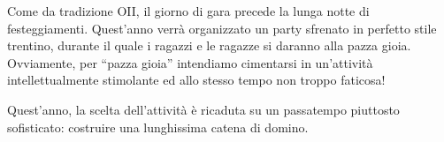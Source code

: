 \usepackage{xcolor}
\usepackage{afterpage}
\usepackage{pifont,mdframed}
\usepackage[bottom]{footmisc}



\renewcommand{\inputfile}{\texttt{stdin}}
\renewcommand{\outputfile}{\texttt{stdout}}
\makeatletter
\renewcommand{\this@inputfilename}{\texttt{stdin}}
\renewcommand{\this@outputfilename}{\texttt{stdout}}
\makeatother

\newenvironment{warning}
  {\par\begin{mdframed}[linewidth=2pt,linecolor=gray]%
    \begin{list}{}{\leftmargin=1cm
                   \labelwidth=\leftmargin}\item[\Large\ding{43}]}
  {\end{list}\end{mdframed}\par}

\newenvironment{todoenv}
{\par\begin{mdframed}[linewidth=2pt,linecolor=red]%
		\begin{list}{}{\leftmargin=1cm
				\labelwidth=\leftmargin}\item[\Large\ding{169}]}
		{\end{list}\end{mdframed}\par}

\newcommand{\todo}[1]{\begin{todoenv}
		TODO: #1
\end{todoenv}}



Come da tradizione OII, il giorno di gara precede la lunga notte di
festeggiamenti. Quest'anno verrà organizzato un party sfrenato
in perfetto stile trentino, durante il quale i ragazzi e le ragazze si daranno alla
pazza gioia. Ovviamente, per ``pazza gioia'' intendiamo cimentarsi in
un'attività intellettualmente stimolante ed allo stesso tempo non troppo
faticosa!

Quest'anno, la scelta dell'attività è ricaduta su un passatempo piuttosto
sofisticato: costruire una lunghissima catena di domino.

